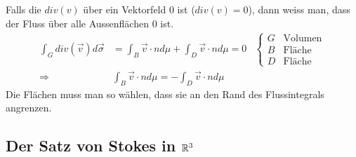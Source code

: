 \documentclass[a4paper]{article}
\begin{document}
		\begin{fregeln}[$div(v)=0$ ausnutzen]
			Falls die $div(v)$ über ein Vektorfeld $0$ ist ($div(v)=0$), dann weiss man, dass der Fluss über alle Aussenflächen $0$ ist.
			\begin{align*}
				\int_G div(\vec v) d \vec \sigma &= \int_B \vec v \cdot n d \mu + \int_D \vec v \cdot n d \mu =0 &\begin{cases} 
																												G &\text{Volumen}\\
				                                                                                                B &\text{Fläche}\\
				                                                                                                D &\text{Fläche}
				                                                                                                \end{cases}\\
				\Longrightarrow \qquad &  \int_B \vec v \cdot n d \mu = -\int_D \vec v \cdot n d \mu
			\end{align*}
			Die Flächen muss man so wählen, dass sie an den Rand des Flussintegrals angrenzen.
		\end{fregeln}


	\subsection{Der Satz von Stokes in $\mathbb{R}^3$ }
	
			
\end{document}
